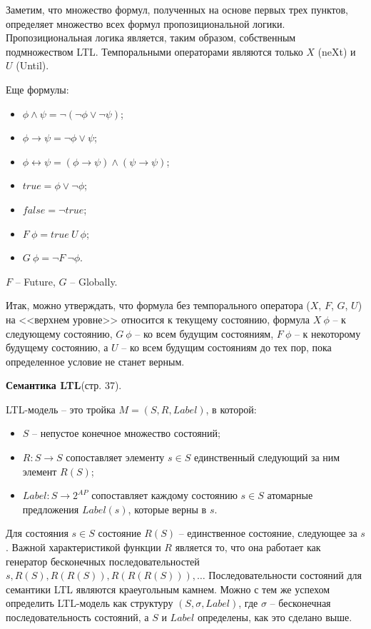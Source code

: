 \documentclass[a4paper,12pt]{article}
\begin{document}
Заметим, что множество формул, полученных на основе первых трех
пунктов, определяет множество всех формул пропозициональной
логики. Пропозициональная логика является, таким образом,
собственным подмножеством LTL. Темпоральными операторами
являются только $X$ (neXt) и $U$ (Until).

Еще формулы:
\begin{itemize}
    \item $\phi \wedge \psi = \lnot (\lnot \phi \vee \lnot \psi)$;
    \item $\phi \rightarrow \psi = \lnot \phi \vee \psi$;
    \item $\phi \leftrightarrow \psi = (\phi \rightarrow \psi) \wedge (\psi \rightarrow \psi)$;
    \item $true = \phi \vee \lnot \phi$;
    \item $false = \lnot true$;
    \item $F\ \phi = true\ U\ \phi$;
    \item $G\ \phi = \lnot F\ \lnot \phi$.
\end{itemize}
$F$ -- Future, $G$ -- Globally.

Итак, можно утверждать, что формула без темпорального оператора
($X$, $F$, $G$, $U$) на <<верхнем уровне>> относится к текущему состоянию,
формула $X\ \phi$ -- к следующему состоянию, $G\ \phi$ -- ко всем будущим
состояниям, $F\ \phi$ -- к некоторому будущему состоянию, а $U$ – ко всем
будущим состояниям до тех пор, пока определенное условие не станет
верным.

\textbf{Семантика LTL}(стр. 37).

LTL-модель – это тройка $M = (S, R, Label)$, в которой:
\begin{itemize}
    \item $S$ – непустое конечное множество состояний;
    \item $R: S \rightarrow S$ сопоставляет элементу $s \in S$ единственный следующий за
ним элемент $R(S)$;
    \item $Label: S \rightarrow 2^{AP}$ сопоставляет каждому состоянию $s \in S$ атомарные
предложения $Label(s)$, которые верны в $s$.
\end{itemize}
Для состояния $s \in S$ состояние $R(S)$ – единственное состояние,
следующее за $s$. Важной характеристикой функции $R$ является то, что
она работает как генератор бесконечных последовательностей $s, R(S),
R(R(S)), R(R(R(S))), \ldots$ Последовательности состояний для семантики
LTL являются краеугольным камнем. Можно с тем же успехом
определить LTL-модель как структуру $(S, \sigma, Label)$, где $\sigma$ --
бесконечная последовательность состояний, а $S$ и $Label$ определены,
как это сделано выше.
\end{document}

